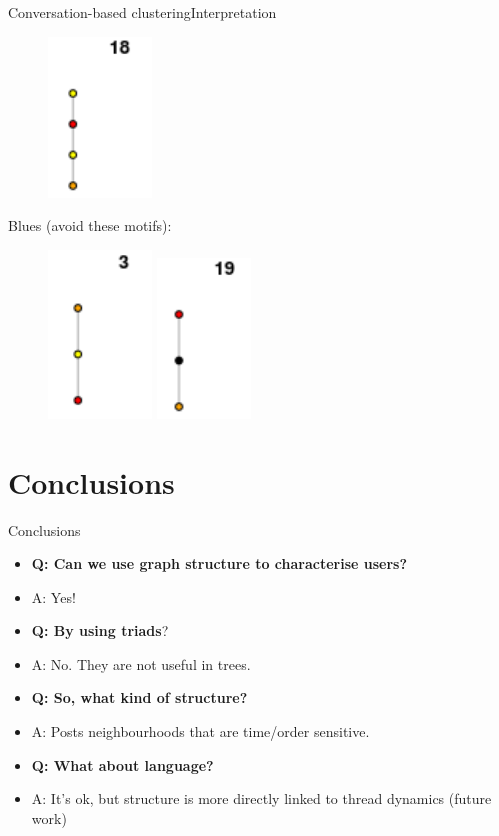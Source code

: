 \documentclass{beamer}
\begin{document}
\begin{frame}{Conversation-based clustering}{Interpretation}
\begin{figure}
		\includegraphics[height=0.17\textwidth]{motif18}	
	\end{figure}	
	Blues (avoid these motifs):
	\begin{figure}
		\centering
		\includegraphics[height=0.17\textwidth]{motif3}
		\includegraphics[height=0.17\textwidth]{motif19}
	\end{figure}	
	\end{frame}

\section{Conclusions}
\begin{frame}{Conclusions}
	\begin{itemize}
	\item \textbf{Q: Can we use graph structure to characterise users?}
	\item A: Yes!
	\end{itemize}	
	\begin{itemize}
	\item \textbf{Q: By using triads}?
	\item A: No. They are not useful in trees.
	\end{itemize}
	\begin{itemize}
	\item \textbf{Q: So, what kind of structure?}
	\item A: Posts neighbourhoods that are time/order sensitive.
	\end{itemize}
	\begin{itemize}
	\item \textbf{Q: What about language?}
	\item A: It's ok, but structure is more directly linked to thread dynamics (future work)
	\end{itemize}
\end{frame}
\end{document}
